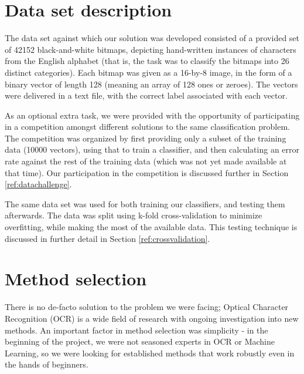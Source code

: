 \documentclass{netsec2012}
\begin{document}
\section{Data set description}

The data set against which our solution was developed consisted of a provided set of 42152
black-and-white bitmaps, depicting hand-written instances of characters from the English alphabet
(that is, the task was to classify the bitmaps into 26 distinct categories).  Each bitmap was given
as a 16-by-8 image, in the form of a binary vector of length 128 (meaning an array of 128 ones or
zeroes).  The vectors were delivered in a text file, with the correct label associated with each
vector.

As an optional extra task, we were provided with the opportunity of participating in a competition
amongst different solutions to the same classification problem.  The competition was organized by
first providing only a subset of the training data (10000 vectors), using that to train a
classifier, and then calculating an error rate against the rest of the training data (which was not
yet made available at that time).  Our participation in the competition is discussed further in
Section \ref{ref:datachallenge}.

The same data set was used for both training our classifiers, and testing them afterwards.  The data
was split using k-fold cross-validation to minimize overfitting, while making the most of the
available data.  This testing technique is discussed in further detail in Section
\ref{ref:crossvalidation}.

%
%
%

\section{Method selection}

There is no de-facto solution to the problem we were facing; Optical Character Recognition (OCR) is
a wide field of research with ongoing investigation into new methods.  An important factor in method
selection was simplicity - in the beginning of the project, we were not seasoned experts in OCR or
Machine Learning, so we were looking for established methods that work robustly even in the hands of
beginners.
\end{document}
